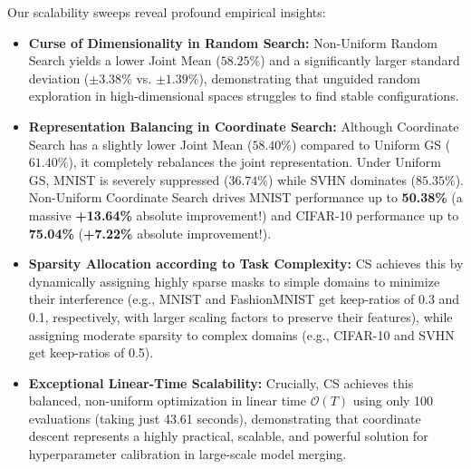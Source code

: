 Our scalability sweeps reveal profound empirical insights:
\begin{itemize}
    \item \textbf{Curse of Dimensionality in Random Search:} Non-Uniform Random Search yields a lower Joint Mean ($58.25\%$) and a significantly larger standard deviation ($\pm 3.38\%$ vs. $\pm 1.39\%$), demonstrating that unguided random exploration in high-dimensional spaces struggles to find stable configurations.
    \item \textbf{Representation Balancing in Coordinate Search:} Although Coordinate Search has a slightly lower Joint Mean ($58.40\%$) compared to Uniform GS ($61.40\%$), it completely rebalances the joint representation. Under Uniform GS, MNIST is severely suppressed ($36.74\%$) while SVHN dominates ($85.35\%$). Non-Uniform Coordinate Search drives MNIST performance up to \textbf{50.38\%} (a massive \textbf{+13.64\%} absolute improvement!) and CIFAR-10 performance up to \textbf{75.04\%} (\textbf{+7.22\%} absolute improvement!). 
    \item \textbf{Sparsity Allocation according to Task Complexity:} CS achieves this by dynamically assigning highly sparse masks to simple domains to minimize their interference (e.g., MNIST and FashionMNIST get keep-ratios of 0.3 and 0.1, respectively, with larger scaling factors to preserve their features), while assigning moderate sparsity to complex domains (e.g., CIFAR-10 and SVHN get keep-ratios of 0.5).
    \item \textbf{Exceptional Linear-Time Scalability:} Crucially, CS achieves this balanced, non-uniform optimization in linear time $\mathcal{O}(T)$ using only 100 evaluations (taking just 43.61 seconds), demonstrating that coordinate descent represents a highly practical, scalable, and powerful solution for hyperparameter calibration in large-scale model merging.
\end{itemize}
